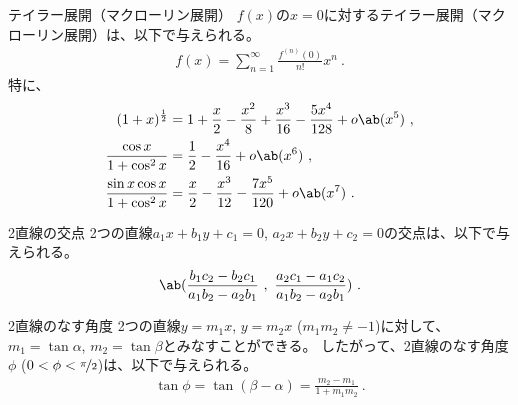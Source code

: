 




\begin{Formula}[label=formula:taylorexpansion]{テイラー展開（マクローリン展開）}
$f(x)$の$x = 0$に対するテイラー展開（マクローリン展開）は、以下で与えられる。
\begin{align*}
  f(x) = \sum_{n=1}^{\infty}\frac{f^{(n)}(0)}{n!}x^n\ .
\end{align*}
\tcbline*
特に、
\begin{align*}
  (1+x)^\frac12 &= 1+\frac x2-\frac{x^2}8+\frac{x^3}{16}-\frac{5x^4}{128}+o\ab(x^5)\ ,\\
  \frac{\cos x}{1+\cos^2x} &= \frac12-\frac{x^4}{16}+o\ab(x^6)\ ,\\
  \frac{\sin x\cos x}{1+\cos^2x} &= \frac x2-\frac{x^3}{12}-\frac{7x^5}{120}+o\ab(x^7)\ .
\end{align*}
\end{Formula}



\begin{Formula}[label=formula:intersectionof2lines]{2直線の交点}
2つの直線$a_1x+b_1y+c_1 = 0$, $a_2x+b_2y+c_2 = 0$の交点は、以下で与えられる。
\begin{align*}
  \ab(
  \frac{b_1c_2-b_2c_1}{a_1b_2-a_2b_1}~,~
  \frac{a_2c_1-a_1c_2}{a_1b_2-a_2b_1}
  )\ .
\end{align*}
\end{Formula}

\begin{Formula}[label=formula:anblebetween2lines]{2直線のなす角度}
2つの直線$y = m_1x$, $y = m_2x$ ($m_1m_2 \ne -1$)に対して、$m_1 = \tan\alpha$, $m_2 = \tan\beta$とみなすことができる。
したがって、2直線のなす角度$\phi$ ($0 < \phi < \nicefrac\pi2$)は、以下で与えられる。
\begin{align*}
  \tan\phi = \tan(\beta-\alpha) = \frac{m_2-m_1}{1+m_1m_2}\ .
\end{align*}
\end{Formula}



